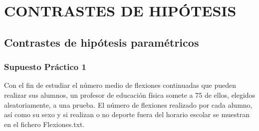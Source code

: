 \documentclass{article}\usepackage[]{graphicx}\usepackage[]{xcolor}
\begin{document}
\section{CONTRASTES DE HIPÓTESIS}
\subsection{ Contrastes de hipótesis paramétricos}
\subsubsection{Supuesto Práctico 1}
Con el fin de estudiar el número medio de flexiones continuadas que pueden realizar sus alumnos, un profesor de educación física somete a 75 de ellos, elegidos aleatoriamente, a una prueba. El número de flexiones realizado por cada alumno, así como su sexo y si realizan o no deporte fuera del horario escolar se muestran en el fichero Flexiones.txt.
\end{document}
